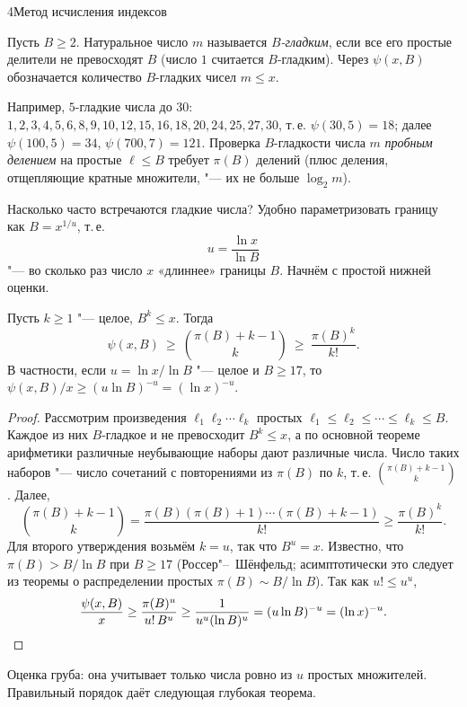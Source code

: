 \begin{lecture}{4}{Метод исчисления индексов}
\begin{definition}
Пусть $B \ge 2$. Натуральное число $m$ называется \emph{$B$-гладким}, если все его простые
делители не превосходят $B$ (число $1$ считается $B$-гладким). Через $\psi(x, B)$ обозначается
количество $B$-гладких чисел $m \le x$.
\end{definition}

Например, $5$-гладкие числа до $30$: $1, 2, 3, 4, 5, 6, 8, 9, 10, 12, 15, 16, 18, 20, 24, 25, 27,
30$, т.\,е. $\psi(30, 5) = 18$; далее $\psi(100, 5) = 34$, $\psi(700, 7) = 121$. Проверка
$B$-гладкости числа $m$ \emph{пробным делением} на простые $\ell \le B$ требует $\pi(B)$ делений
(плюс деления, отщепляющие кратные множители, "--- их не больше $\log_2 m$).

Насколько часто встречаются гладкие числа? Удобно параметризовать границу как $B = x^{1/u}$, т.\,е.
\[
  u = \frac{\ln x}{\ln B}
\]
"--- во сколько раз число $x$ «длиннее» границы $B$. Начнём с простой нижней оценки.

\begin{proposition}\label{l4:psi-lower}
Пусть $k \ge 1$ "--- целое, $B^k \le x$. Тогда
\[
  \psi(x, B) \ \ge\ \binom{\pi(B) + k - 1}{k} \ \ge\ \frac{\pi(B)^k}{k!}.
\]
В частности, если $u = \ln x / \ln B$ "--- целое и $B \ge 17$, то
$\psi(x, B)/x \ge (u \ln B)^{-u} = (\ln x)^{-u}$.
\end{proposition}

\begin{proof}
Рассмотрим произведения $\ell_1 \ell_2 \cdots \ell_k$ простых $\ell_1 \le \ell_2 \le \cdots \le
\ell_k \le B$. Каждое из них $B$-гладкое и не превосходит $B^k \le x$, а по основной теореме
арифметики различные неубывающие наборы дают различные числа. Число таких наборов "--- число
сочетаний с повторениями из $\pi(B)$ по $k$, т.\,е. $\binom{\pi(B) + k - 1}{k}$. Далее,
\[
  \binom{\pi(B) + k - 1}{k} = \frac{\pi(B)(\pi(B) + 1) \cdots (\pi(B) + k - 1)}{k!}
  \ge \frac{\pi(B)^k}{k!}.
\]
Для второго утверждения возьмём $k = u$, так что $B^u = x$. Известно, что $\pi(B) > B/\ln B$ при
$B \ge 17$ (Россер"--~Шёнфельд; асимптотически это следует из теоремы о распределении простых
$\pi(B) \sim B/\ln B$). Так как $u! \le u^u$,
\[
  \frac{\psi(x, B)}{x} \ge \frac{\pi(B)^u}{u!\,B^u} \ge \frac{1}{u^u (\ln B)^u}
  = (u \ln B)^{-u} = (\ln x)^{-u}. \qedhere
\]
\end{proof}

Оценка груба: она учитывает только числа ровно из $u$ простых множителей. Правильный порядок
даёт следующая глубокая теорема.


\end{lecture}
